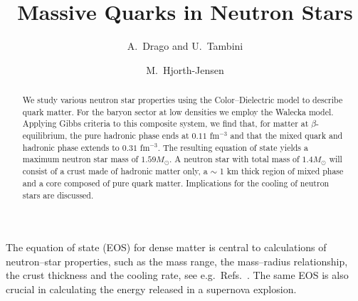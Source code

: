 \clearpage




\draft
\title{Massive Quarks in Neutron Stars}

\author{A.\ Drago and U.\ Tambini}

\address{Dipartimento di Fisica, Universit\'{a} di Ferrara, and INFN,
Sezione di Ferrara, Via Paradiso 12, I-44100 Ferrara, Italy}

\author{M.\ Hjorth-Jensen}

\address{ECT*, European Centre for Theoretical
Studies in Nuclear Physics and Related Areas, Trento, Italy}



\maketitle

\begin{abstract}

We study various neutron star properties
using the Color--Dielectric model 
to describe quark matter. For the baryon
sector at low densities we employ 
the Walecka model.
Applying Gibbs criteria to this composite system, we find
that, for matter at $\beta$-equilibrium, the pure hadronic phase ends at 
$0.11$ fm$^{-3}$ and that the mixed quark and hadronic phase  
extends to  
$0.31$ fm$^{-3}$. 
The resulting equation of state yields a maximum neutron
star mass of $1.59 M_{\odot}$.
A neutron star with total mass
of $1.4 M_{\odot}$
will consist of a crust made of hadronic matter only, 
a $\sim$ 1 km thick region of mixed phase and 
a core composed of pure  
quark matter. Implications for the cooling of neutron stars
are discussed.

\end{abstract}



\clearpage


The equation of state (EOS) for dense matter is central to calculations of
neutron--star properties, such as the mass range, the mass--radius
relationship, the crust thickness
and the cooling rate,
see
e.g.\  Refs.\ \cite{prl95,lrp93}. The same EOS is also crucial
in calculating the energy released in a supernova explosion.

